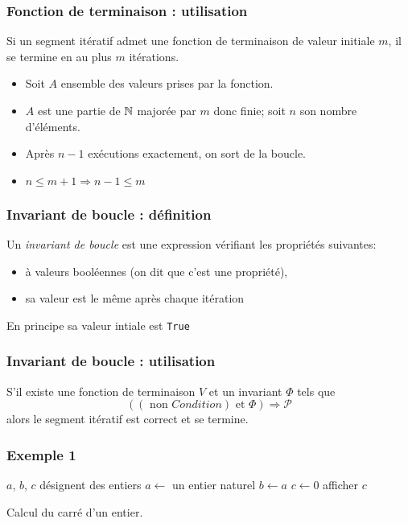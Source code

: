 \begin{frame}
  \frametitle{Fonction de terminaison : utilisation}
\begin{prop}
  Si un segment itératif admet une fonction de terminaison de valeur initiale $m$, il se termine en au plus $m$ itérations.
\end{prop}
\begin{itemize}
  \item Soit $A$ ensemble des valeurs prises par la fonction.
  \item $A$ est une partie de $\mathbb{N}$ majorée par $m$ donc finie; soit $n$ son nombre d'éléments.
  \item Après $n-1$ exécutions exactement, on sort de la boucle.
  \item $n\leq m+1 \Rightarrow n-1 \leq m$
\end{itemize}
\end{frame}

\begin{frame}
  \frametitle{Invariant de boucle : définition}
\begin{defi}
  Un \emph{invariant de boucle} est une expression vérifiant les propriétés suivantes:
\begin{itemize}
  \item à valeurs booléennes (on dit que c'est une propriété),
  \item sa valeur est le même après chaque itération
\end{itemize}
\end{defi}
En principe sa valeur intiale est \texttt{True}
\end{frame}

\begin{frame}
  \frametitle{Invariant de boucle : utilisation}
\begin{prop}
S'il existe une fonction de terminaison $V$ et un invariant $\Phi$ tels que
\begin{displaymath}
  \left( \left( \text{ non } Condition\right) \text{ et } \Phi \right) \Rightarrow \mathcal{P}
\end{displaymath}
alors le segment itératif est correct et se termine.
\end{prop}
\end{frame}

\begin{frame}
  \frametitle{Exemple 1}
\begin{algorithm}[H]
  $a$, $b$, $c$ désignent des entiers\;
  $a\longleftarrow$ un entier naturel\;
  $b\longleftarrow a$\;
  $c\longleftarrow 0$\;
  afficher $c$\;
  \caption{Calcul du carré d'un entier.}
  \label{corsegit_2}
\end{algorithm}
\end{frame}


